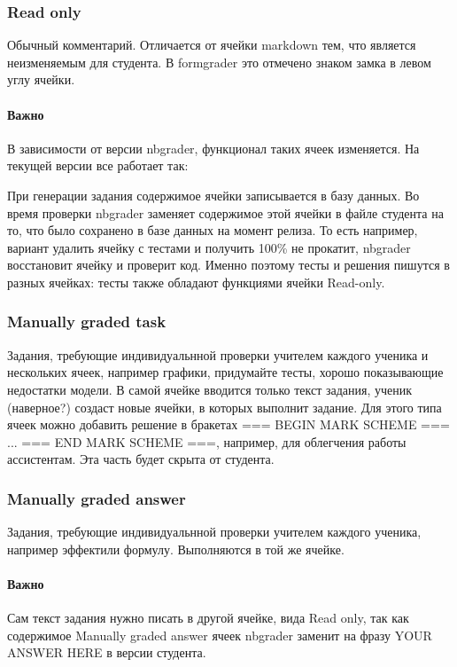 \documentclass[a4paper,12pt]{article}
\begin{document}
\subsubsection{Read only}

Обычный комментарий. Отличается от ячейки markdown тем, что является неизменяемым для студента. В formgrader это отмечено знаком замка в левом углу ячейки.
\paragraph{Важно}
В зависимости от версии nbgrader, функционал таких ячеек изменяется. На текущей версии все работает так:

При генерации задания содержимое ячейки записывается в базу данных. Во время проверки nbgrader заменяет содержимое этой ячейки в файле студента на то, что было сохранено в базе данных на момент релиза. То есть например, вариант удалить ячейку с тестами и получить 100\% не прокатит, nbgrader восстановит ячейку и проверит код. Именно поэтому тесты и решения пишутся в разных ячейках: тесты также обладают функциями ячейки Read-only. 
\subsubsection{Manually graded task}

Задания, требующие индивидуальнной проверки учителем каждого ученика и нескольких ячеек, например  графики, придумайте тесты, хорошо показывающие недостатки модели\grqq. В самой ячейке вводится только текст задания, ученик (наверное?) создаст новые ячейки, в которых выполнит задание.
Для этого типа ячеек можно добавить решение в бракетах === BEGIN MARK SCHEME === ... === END MARK SCHEME ===,
например, для облегчения работы ассистентам. Эта часть будет скрыта от студента.

\subsubsection{Manually graded answer}

Задания, требующие индивидуальнной проверки учителем каждого ученика, например  эффект\grqq или  формулу\grqq. Выполняются в той же ячейке.
\paragraph{Важно}Сам текст задания нужно писать в другой ячейке, вида Read only, так как содержимое Manually graded answer ячеек nbgrader заменит на фразу YOUR ANSWER HERE в версии студента.
\end{document}
